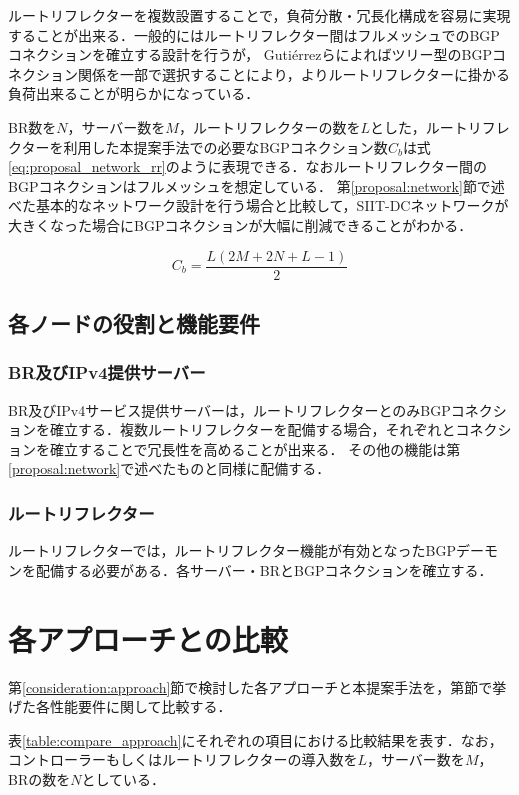 ルートリフレクターを複数設置することで，負荷分散・冗長化構成を容易に実現することが出来る．一般的にはルートリフレクター間はフルメッシュでのBGPコネクションを確立する設計を行うが，
Gutiérrezらによればツリー型のBGPコネクション関係を一部で選択することにより，よりルートリフレクターに掛かる負荷出来ることが明らかになっている\cite{6838346}．

BR数を$N$，サーバー数を$M$，ルートリフレクターの数を$L$とした，ルートリフレクターを利用した本提案手法での必要なBGPコネクション数$C_b$は式\ref{eq:proposal_network_rr}のように表現できる．なおルートリフレクター間のBGPコネクションはフルメッシュを想定している．
第\ref{proposal:network}節で述べた基本的なネットワーク設計を行う場合と比較して，SIIT-DCネットワークが大きくなった場合にBGPコネクションが大幅に削減できることがわかる．


\begin{equation}
    C_b = \frac{L(2M + 2N + L - 1)}{2}
    \label{eq:proposal_network_rr}
\end{equation}

\subsection{各ノードの役割と機能要件}
\subsubsection{BR及びIPv4提供サーバー}
BR及びIPv4サービス提供サーバーは，ルートリフレクターとのみBGPコネクションを確立する．複数ルートリフレクターを配備する場合，それぞれとコネクションを確立することで冗長性を高めることが出来る．
その他の機能は第\ref{proposal:network}で述べたものと同様に配備する．

\subsubsection{ルートリフレクター}
ルートリフレクターでは，ルートリフレクター機能が有効となったBGPデーモンを配備する必要がある．各サーバー・BRとBGPコネクションを確立する．


\section{各アプローチとの比較}
\label{proposal:compare}
第\ref{consideration:approach}節で検討した各アプローチと本提案手法を，第\label{consideration:points}節で挙げた各性能要件に関して比較する．

表\ref{table:compare_approach}にそれぞれの項目における比較結果を表す．なお，コントローラーもしくはルートリフレクターの導入数を$L$，サーバー数を$M$，BRの数を$N$としている．



